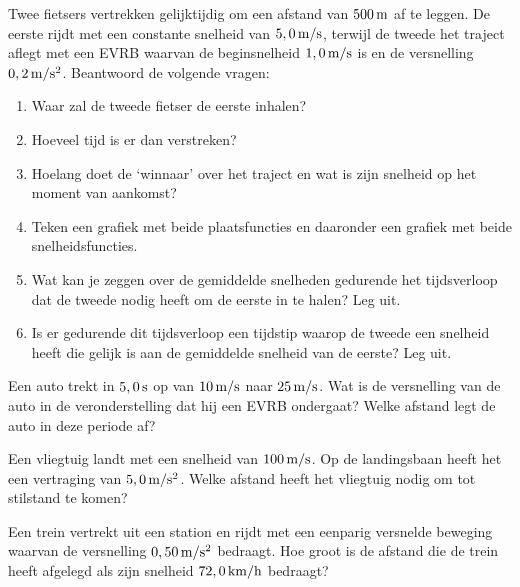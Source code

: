 \begin{exercise} Twee fietsers vertrekken gelijktijdig om een afstand van $500\rm\,m$ af te leggen. De eerste rijdt met een constante snelheid van $5,0\rm\,m/s$, terwijl de tweede het traject aflegt met een EVRB waarvan de beginsnelheid $1,0\rm\,m/s$ is en de versnelling $0,2\rm\,m/s^2$. Beantwoord de volgende vragen:
\begin{enumerate}
\item Waar zal de tweede fietser de eerste inhalen? 
\item Hoeveel tijd is er dan verstreken? 
\item Hoelang doet de `winnaar' over het traject en wat is zijn snelheid op het moment van aankomst?
\item Teken een grafiek met beide plaatsfuncties en daaronder een grafiek met beide snelheidsfuncties. 
\item Wat kan je zeggen over de gemiddelde snelheden gedurende het tijdsverloop dat de tweede nodig heeft om de eerste in te halen? Leg uit.
\item Is er gedurende dit tijdsverloop een tijdstip waarop de tweede een snelheid heeft die gelijk is aan de
gemiddelde snelheid van de eerste? Leg uit.
\end{enumerate}

\end{exercise}

\begin{exercise} Een auto trekt in $5,0\rm\,s$ op van $10\rm\,m/s$ naar $25\rm\,m/s$. Wat is de versnelling van de auto in de veronderstelling dat hij een EVRB ondergaat? Welke afstand legt de auto in deze periode af?

\end{exercise}

\begin{exercise} Een vliegtuig landt met een snelheid van $100\rm\,m/s$. Op de landingsbaan heeft het een vertraging van $5,0\rm\,m/s^2$. Welke afstand heeft het vliegtuig nodig om tot stilstand te komen? %

\end{exercise}

\begin{exercise} Een trein vertrekt uit een station en rijdt met een eenparig versnelde beweging waarvan de versnelling $0,50\rm\,m/s^2$ bedraagt. Hoe groot is de afstand die de trein heeft afgelegd als zijn snelheid $72,0\rm\,km/h$ bedraagt?

\end{exercise}

